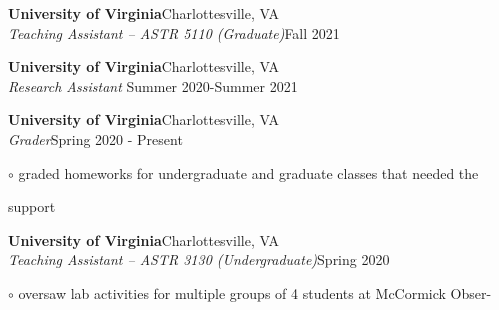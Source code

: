 \documentclass[letterpaper,12pt]{article}
\begin{document}
\noindent{}

\vspace{2mm}
\begin{minipage}{6.1in}
\textbf{University of Virginia}\hfill Charlottesville, VA\\ %
\textit{Teaching Assistant -- ASTR 5110 (Graduate)}\hfill Fall 2021


\vspace{2mm}
\textbf{University of Virginia}\hfill Charlottesville, VA\\ %
\textit{Research Assistant 
}\hfill Summer 2020-Summer 2021

\vspace{2mm}
\textbf{University of Virginia}\hfill Charlottesville, VA\\ %
\textit{Grader}\hfill Spring 2020 - Present

\hspace{0.5in} $\circ$ graded homeworks for undergraduate and graduate classes that needed the 

\vspace{-0.5mm}
\hspace{0.64in} support

\vspace{2mm}
\textbf{University of Virginia}\hfill Charlottesville, VA\\ %
\textit{Teaching Assistant -- ASTR 3130 (Undergraduate)}\hfill Spring 2020

\hspace{0.5in} $\circ$ oversaw lab activities for multiple groups of 4 students at McCormick Obser-


\end{minipage}
\end{document}
